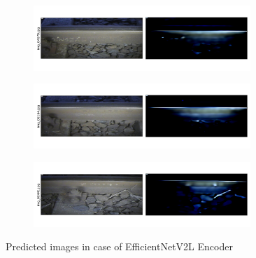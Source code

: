 \begin{figure}[!ht]
    \centering
    \begin{subfigure}{\textwidth}
        \centering
        \includegraphics[width=0.9\textwidth,trim={0 1cm 0 1cm},clip]{./results/efficientnetv2l_vgg19/20230525_194238_predict_0.png}
    \end{subfigure}
    \begin{subfigure}{\textwidth}
        \centering
        \includegraphics[width=0.9\textwidth,trim={0 1cm 0 1cm},clip]{./results/efficientnetv2l_vgg19/20230525_194238_predict_1.png}
    \end{subfigure}
    \begin{subfigure}{\textwidth}
        \centering
        \includegraphics[width=0.9\textwidth,trim={0 1cm 0 1cm},clip]{./results/efficientnetv2l_vgg19/20230525_194238_predict_2.png}
    \end{subfigure}
    \caption{Predicted images in case of EfficientNetV2L Encoder}
    \label{fig:efficientnetv2l_examples}
\end{figure}



